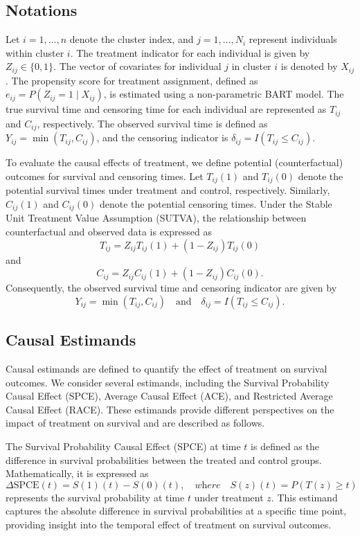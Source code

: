 \documentclass[useAMS,referee]{biom}
\begin{document}
\subsection{Notations}
Let \( i = 1, \ldots, n \) denote the cluster index, and \( j = 1, \ldots, N_i \) represent individuals within cluster \( i \). The treatment indicator for each individual is given by \( Z_{ij} \in \{0, 1\} \). The vector of covariates for individual \( j \) in cluster \( i \) is denoted by \( X_{ij} \). The propensity score for treatment assignment, defined as \( e_{ij} = P(Z_{ij} = 1 \mid X_{ij}) \), is estimated using a non-parametric BART model. The true survival time and censoring time for each individual are represented as \( T_{ij} \) and \( C_{ij} \), respectively. The observed survival time is defined as \( Y_{ij} = \min(T_{ij}, C_{ij}) \), and the censoring indicator is \( \delta_{ij} = I(T_{ij} \leq C_{ij})\).

To evaluate the causal effects of treatment, we define potential (counterfactual) outcomes for survival and censoring times. Let \( T_{ij}(1) \) and \( T_{ij}(0) \) denote the potential survival times under treatment and control, respectively. Similarly, \( C_{ij}(1) \) and \( C_{ij}(0) \) denote the potential censoring times. Under the Stable Unit Treatment Value Assumption (SUTVA), the relationship between counterfactual and observed data is expressed as 
\[
T_{ij} = Z_{ij} T_{ij}(1) + (1 - Z_{ij}) T_{ij}(0)
\]
and 
\[
C_{ij} = Z_{ij} C_{ij}(1) + (1 - Z_{ij}) C_{ij}(0).
\]
Consequently, the observed survival time and censoring indicator are given by 
\[
Y_{ij} = \min(T_{ij}, C_{ij}) \quad \text{and} \quad \delta_{ij} = I(T_{ij} \leq C_{ij}).
\]

\subsection{Causal Estimands}

Causal estimands are defined to quantify the effect of treatment on survival outcomes. We consider several estimands, including the Survival Probability Causal Effect (SPCE), Average Causal Effect (ACE), and Restricted Average Causal Effect (RACE). These estimands provide different perspectives on the impact of treatment on survival and are described as follows.

The Survival Probability Causal Effect (SPCE) at time \( t \) is defined as the difference in survival probabilities between the treated and control groups. Mathematically, it is expressed as 
\[
\Delta \text{SPCE}(t) = S(1)(t) - S(0)(t), \quad \textit{where} \quad S(z)(t) = P(T(z) \geq t)
\]
represents the survival probability at time \( t \) under treatment \( z \). This estimand captures the absolute difference in survival probabilities at a specific time point, providing insight into the temporal effect of treatment on survival outcomes.
\end{document}
